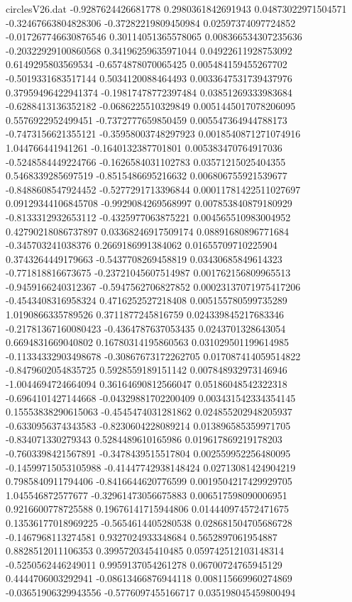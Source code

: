 \begin{filecontents}{circlesV26.dat}
-0.9287624426681778	0.2980361842691943	0.04873022971504571
-0.32467663804828306	-0.37282219809450984	0.02597374097724852
-0.017267746630876546	0.30114051365578065	0.008366534307235636
-0.20322929100860568	0.34196259635971044	0.04922611928753092
0.6149295803569534	-0.6574878070065425	0.005484159455267702
-0.5019331683517144	0.5034120088464493	0.0033647531739437976
0.37959496422941374	-0.19817478772397484	0.03851269333983684
-0.6288413136352182	-0.0686225510329849	0.0051445017078206095
0.5576922952499451	-0.7372777659850459	0.005547364944788173
-0.7473156621355121	-0.35958003748297923	0.0018540871271074916
1.044766441941261	-0.1640132387701801	0.005383470764917036
-0.5248584449224766	-0.1626584031102783	0.03571215025404355
0.5468339285697519	-0.8515486695216632	0.006806755921539677
-0.8488608547924452	-0.5277291713396844	0.00011781422511027697
0.09129344106845708	-0.9929084269568997	0.007853840879180929
-0.8133312932653112	-0.4325977063875221	0.004565510983004952
0.42790218086737897	0.03368246917509174	0.08891680896771684
-0.345703241038376	0.2669186991384062	0.01655709710225904
0.3743264449179663	-0.5437708269458819	0.03430685849614323
-0.771818816673675	-0.23721045607514987	0.001762156809965513
-0.9459166240312367	-0.5947562706827852	0.00023137071975417206
-0.4543408316958324	0.4716252527218408	0.005155780599735289
1.0190866335789526	0.3711877245816759	0.024339845217683346
-0.21781367160080423	-0.4364787637053435	0.0243701328643054
0.6694831669040802	0.16780314195860563	0.031029501199614985
-0.11334332903498678	-0.30867673172262705	0.017087414059514822
-0.8479602054835725	0.5928559189151142	0.007848932973146946
-1.0044694724664094	0.36164690812566047	0.05186048542322318
-0.6964101427144668	-0.04329881702200409	0.003431542334354145
0.15553838290615063	-0.4545474031281862	0.024855202948205937
-0.6330956374343583	-0.8230604228089214	0.013896585359971705
-0.834071330279343	0.5284489610165986	0.019617869219178203
-0.7603398421567891	-0.3478439515517804	0.002559952256480095
-0.14599715053105988	-0.41447742938148424	0.02713081424904219
0.7985840911794406	-0.8416644620776599	0.0019504217429929705
1.045546872577677	-0.32961473056675883	0.006517598090006951
0.9216600778725588	0.19676141715944806	0.014440974572471675
0.13536177018969225	-0.5654614405280538	0.028681504705686728
-0.1467968113274581	0.9327024933348684	0.5652897061954887
0.8828512011106353	0.3995720345410485	0.059742512103148314
-0.5250562446249011	0.9959137054261278	0.06700724765945129
0.4444706003292941	-0.08613466876944118	0.008115669960274869
-0.03651906329943556	-0.5776097455166717	0.035198045459800494

\end{filecontents}
